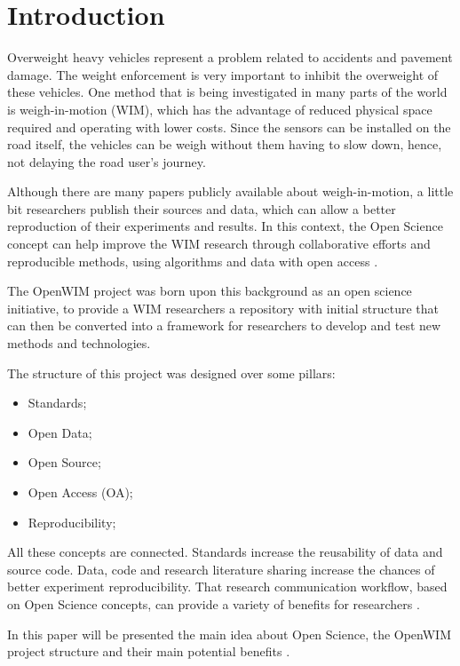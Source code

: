 \documentclass[a4paper]{article}
\begin{document}
\section{Introduction}
{

Overweight heavy vehicles represent a problem related to accidents and pavement damage. The weight enforcement is very important to inhibit the overweight of these vehicles. One method that is being investigated in many parts of the world is weigh-in-motion (WIM), which has the advantage of reduced physical space required and operating with lower costs. Since the sensors can be installed on the road itself, the vehicles can be weigh without them having to slow down, hence, not delaying the road user’s journey.

Although there are many papers publicly available about weigh-in-motion, a little bit researchers publish their sources and data, which can allow a better reproduction of their experiments and results. In this context, the Open Science concept can help improve the WIM research through collaborative efforts and reproducible methods, using algorithms and data with open access \cite{garvin2008yours}.

The OpenWIM project was born upon this background as an open science initiative, to provide a WIM researchers a repository with initial structure that can then be converted into a framework for researchers to develop and test new methods and technologies.

The structure of this project was designed over some pillars:
\begin{itemize}
\item Standards;
\item Open Data;
\item Open Source;
\item Open Access (OA);
\item Reproducibility;
\end{itemize}

All these concepts are connected. Standards increase the reusability of data and source code. Data, code and research literature sharing increase the chances of better experiment reproducibility. That research communication workflow, based on Open Science concepts, can provide a variety of benefits for researchers \cite{article:the-open-research-value-proposition}.

In this paper will be presented the main idea about Open Science, the OpenWIM project structure and their main potential benefits .


}
\end{document}
